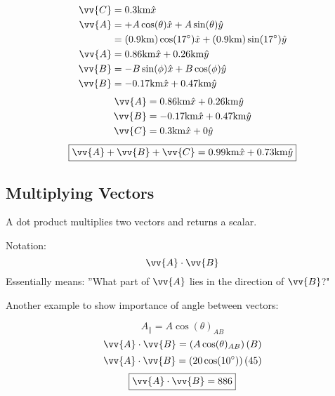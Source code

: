 \documentclass{article}
\begin{document}
\begin{align*}
    \vv{C} & = 0.3 \text{km} \hat{x} \\
    \vv{A} & = +A \cos(\theta) \hat{x} + A \sin(\theta) \hat{y} \\
           & = (0.9 \text{km}) \cos(17 \degree) \hat{x} + (0.9 \text{km}) \sin(17 \degree) \hat{y} \\
    \vv{A} & = 0.86 \text{km} \hat{x} + 0.26 \text{km} \hat{y} \\
    \vv{B} & = -B \sin(\phi) \hat{x} + B \cos(\phi) \hat{y} \\
    \vv{B} & = -0.17 \text{km} \hat{x} + 0.47 \text{km} \hat{y}
\end{align*}
\begin{align*}
    \vv{A} & = 0.86 \text{km} \hat{x} + 0.26 \text{km} \hat{y} \\
    \vv{B} & = -0.17 \text{km} \hat{x} + 0.47 \text{km} \hat{y} \\
    \vv{C} & = 0.3 \text{km} \hat{x} + 0 \hat{y}
\end{align*}
\begin{equation*}
    \boxed{\vv{A} + \vv{B} + \vv{C} = 0.99 \text{km} \hat{x} + 0.73 \text{km} \hat{y}}
\end{equation*}

\subsection{Multiplying Vectors}

A dot product multiplies two vectors and returns a scalar.

Notation:
$$ \vv{A} \cdot \vv{B} $$
Essentially means: ''What part of $ \vv{A} $ lies in the direction of $ \vv{B} $?"


Another example to show importance of angle between vectors:


$$ A_{\parallel} = A \cos(\theta)_{AB} $$
$$ \vv{A} \cdot \vv{B} = \left( A \cos(\theta)_{AB} \right) \left( B \right) $$
$$ \vv{A} \cdot \vv{B} = \left( 20 \cos(10 \degree) \right) (45) $$
\begin{equation*}
    \boxed{\vv{A} \cdot \vv{B} = 886}
\end{equation*}
\end{document}
